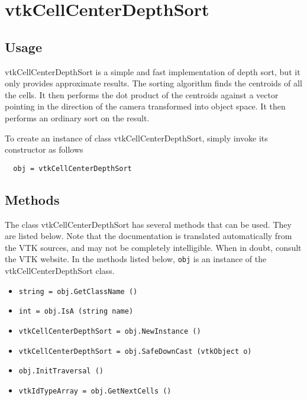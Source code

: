 \section{vtkCellCenterDepthSort}

\subsection{Usage}

 vtkCellCenterDepthSort is a simple and fast implementation of depth
 sort, but it only provides approximate results.  The sorting algorithm
 finds the centroids of all the cells.  It then performs the dot product
 of the centroids against a vector pointing in the direction of the
 camera transformed into object space.  It then performs an ordinary sort
 on the result.


To create an instance of class vtkCellCenterDepthSort, simply
invoke its constructor as follows
\begin{verbatim}
  obj = vtkCellCenterDepthSort
\end{verbatim}
\subsection{Methods}

The class vtkCellCenterDepthSort has several methods that can be used.
  They are listed below.
Note that the documentation is translated automatically from the VTK sources,
and may not be completely intelligible.  When in doubt, consult the VTK website.
In the methods listed below, \verb|obj| is an instance of the vtkCellCenterDepthSort class.
\begin{itemize}
\item  \verb|string = obj.GetClassName ()|

\item  \verb|int = obj.IsA (string name)|

\item  \verb|vtkCellCenterDepthSort = obj.NewInstance ()|

\item  \verb|vtkCellCenterDepthSort = obj.SafeDownCast (vtkObject o)|

\item  \verb|obj.InitTraversal ()|

\item  \verb|vtkIdTypeArray = obj.GetNextCells ()|

\end{itemize}
